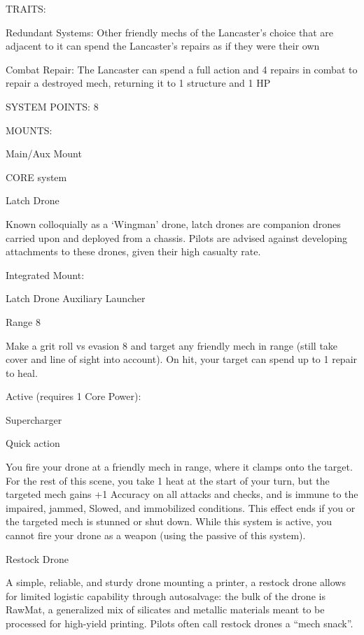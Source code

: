                                                    TRAITS: 

  Redundant Systems: Other friendly mechs of the Lancaster’s choice that are adjacent to it can spend  
  the Lancaster’s repairs as if they were their own
 
  Combat Repair: The Lancaster can spend a full action and 4 repairs in combat to repair a destroyed  
  mech, returning it to 1 structure and 1 HP 

                                             SYSTEM POINTS: 8 

                                                   MOUNTS: 

  Main/Aux Mount 

                                                CORE system 

                                                                                                            


                                                      Latch Drone  

  Known colloquially as a ‘Wingman’ drone, latch drones are companion drones carried upon and  
  deployed from a chassis. Pilots are advised against developing attachments to these drones, given their  
  high casualty rate.
 

   Integrated Mount:
 
  Latch Drone  
  Auxiliary Launcher
 
   Range 8
 
   Make a grit roll vs evasion 8 and target any friendly mech in range (still take cover and line of sight into  
   account). On hit, your target can spend up to 1 repair to heal.
 

  Active (requires 1 Core Power):
 
   Supercharger
 
   Quick action
 
  You fire your drone at a friendly mech in range, where it clamps onto the target. For the rest of this  
   scene, you take 1 heat at the start of your turn, but the targeted mech gains +1 Accuracy on all attacks  
   and checks, and is immune to the impaired, jammed, Slowed, and immobilized conditions. This effect  
   ends if you or the targeted mech is stunned or shut down. While this system is active, you cannot fire  
  your drone as a weapon (using the passive of this system). 

Restock Drone   

A simple, reliable, and sturdy drone mounting a printer, a restock drone allows for limited logistic capability  
through autosalvage: the bulk of the drone is RawMat, a generalized mix of silicates and metallic materials  
meant to be processed for high-yield printing. Pilots often call restock drones a “mech snack”.    


